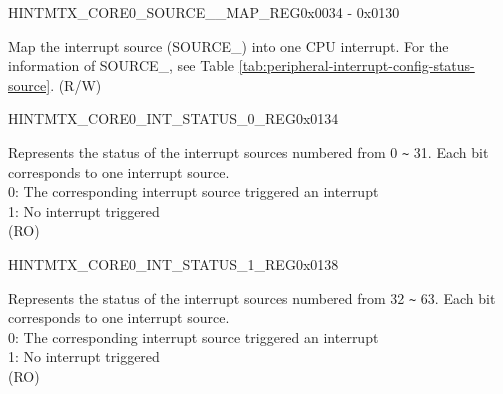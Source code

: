 \begin{register}{H}{INTMTX\_CORE0\_SOURCE\_\_MAP\_REG}{0x0034 - 0x0130}\label{regdesc:INTMTXCORE0SOURCEXMAPREG}
%
%
\regnewline%
\begin{regdesc}\begin{reglist}
\label{fielddesc:INTMTXCORE0SOURCEXMAP}\item [INTMTX\_CORE0\_SOURCE\_\regindex{X}\_MAP] Map the interrupt source (SOURCE\_) into one CPU interrupt. For the information of SOURCE\_, see Table \ref{tab:peripheral-interrupt-config-status-source}. (R/W)
\end{reglist}\end{regdesc}
\end{register}


\begin{register}{H}{INTMTX\_CORE0\_INT\_STATUS\_0\_REG}{0x0134}\label{regdesc:INTMTXCORE0INTSTATUS0REG}
%
\regnewline%
\begin{regdesc}\begin{reglist}
\label{fielddesc:INTMTXCORE0INTSTATUS0}\item [INTMTX\_CORE0\_INT\_STATUS\_0] Represents the status of the interrupt sources numbered from 0 \verb+~+ 31. Each bit corresponds to one interrupt source. \\
0: The corresponding interrupt source triggered an interrupt\\
1: No interrupt triggered\\
(RO)
\end{reglist}\end{regdesc}
\end{register}


\begin{register}{H}{INTMTX\_CORE0\_INT\_STATUS\_1\_REG}{0x0138}\label{regdesc:INTMTXCORE0INTSTATUS1REG}
%
\regnewline%
\begin{regdesc}\begin{reglist}
\label{fielddesc:INTMTXCORE0INTSTATUS1}\item [INTMTX\_CORE0\_INT\_STATUS\_1] Represents the status of the interrupt sources numbered from 32 \verb+~+ 63. Each bit corresponds to one interrupt source. \\
0: The corresponding interrupt source triggered an interrupt\\
1: No interrupt triggered\\
(RO)
\end{reglist}\end{regdesc}
\end{register}



